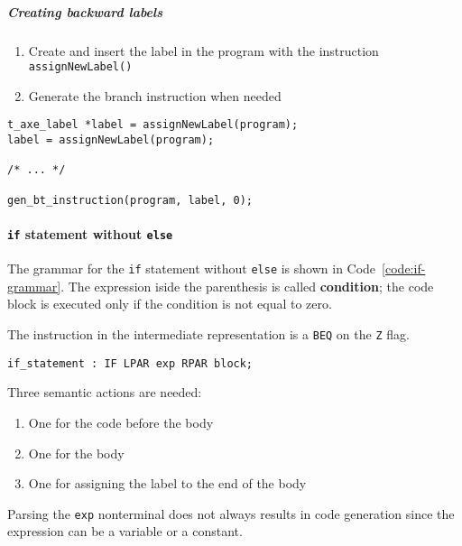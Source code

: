 \documentclass[english]{article}
\begin{document}
\subparagraph*{Creating backward labels}

\begin{enumerate}
  \item Create and insert the label in the program with the instruction \texttt{assignNewLabel()}
  \item Generate the branch instruction when needed
\end{enumerate}

\begin{onepage}
  \begin{lstlisting}[language=LANCE, caption={Creating backward labels}, label={code:backward-labels}]
t_axe_label *label = assignNewLabel(program);
label = assignNewLabel(program);

/* ... */

gen_bt_instruction(program, label, 0);
\end{lstlisting}
\end{onepage}

\paragraph{\texttt{if} statement without \texttt{else}}

The grammar for the \texttt{if} statement without \texttt{else} is shown in Code~\ref{code:if-grammar}.
The expression iside the parenthesis is called \textbf{condition};
the code block is executed only if the condition is not equal to zero.

The instruction in the intermediate representation is a \texttt{BEQ} on the \texttt{Z} flag.

\begin{onepage}
  \begin{lstlisting}[language=LANCE, caption={Grammar for the if statement}, label={code:if-grammar}]
if_statement : IF LPAR exp RPAR block;
\end{lstlisting}
\end{onepage}

Three semantic actions are needed:

\begin{enumerate}
  \item One for the code before the body
  \item One for the body
  \item One for assigning the label to the end of the body
\end{enumerate}

Parsing the \texttt{exp} nonterminal does not always results in code generation since the expression can be a variable or a constant.
\end{document}
